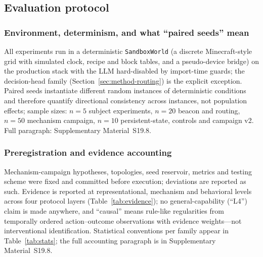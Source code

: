 \documentclass[10pt]{article}
\begin{document}
\subsection{Evaluation protocol}
\label{sec:method}

\subsubsection{Environment, determinism, and what ``paired seeds'' mean}
\label{sec:method-env}
All experiments run in a deterministic \texttt{SandboxWorld} (a discrete Minecraft-style grid with simulated clock, recipe and block tables, and a pseudo-device bridge) on the production stack with the LLM hard-disabled by import-time guards; the decision-head family (Section~\ref{sec:method-routing}) is the explicit exception. Paired seeds instantiate different random instances of deterministic conditions and therefore quantify directional consistency across instances, not population effects; sample sizes: $n{=}5$ subject experiments, $n{=}20$ beacon and routing, $n{=}50$ mechanism campaign, $n{=}10$ persistent-state, controls and campaign v2. Full paragraph: Supplementary Material~S19.8.

\subsubsection{Preregistration and evidence accounting}
\label{sec:method-prereg}
Mechanism-campaign hypotheses, topologies, seed reservoir, metrics and testing scheme were fixed and committed before execution; deviations are reported as such. Evidence is reported at representational, mechanism and behavioral levels across four protocol layers (Table~\ref{tab:evidence}); no general-capability (``L4'') claim is made anywhere, and ``causal'' means rule-like regularities from temporally ordered action--outcome observations with evidence weights---not interventional identification. Statistical conventions per family appear in Table~\ref{tab:stats}; the full accounting paragraph is in Supplementary Material~S19.8.
\end{document}
